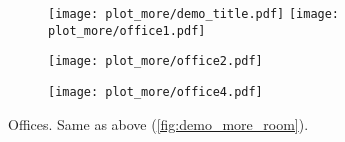 \documentclass[10pt,twocolumn,letterpaper]{article}
\begin{document}
\begin{figure*}[t]  \begin{center}
  \begin{subfigure}{\linewidth}
    \texttt{[image: plot\_more/demo\_title.pdf]}
    \texttt{[image: plot\_more/office1.pdf]}
  \caption{}
  \end{subfigure}

  \begin{subfigure}{\linewidth}
    \texttt{[image: plot\_more/office2.pdf]}
  \caption{}
  \end{subfigure}
  \begin{subfigure}{\linewidth}
    \texttt{[image: plot\_more/office4.pdf]}
  \caption{}
  \end{subfigure}
  \end{center}
  \caption{Offices. Same as above (\cref{fig:demo_more_room}).}
  \label{fig:demo_more_office}
\end{figure*}
\end{document}
